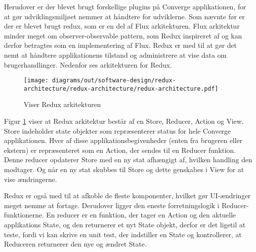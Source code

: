 Herudover er der blevet brugt forskellige plugins på Converge applikationen, for at gør udviklingsmiljøet nemmer at håndtere for udviklerne. Som nævnte før er der er blevet brugt redux, som er en del af Flux arkitekturen. Flux arkitektur minder meget om observer-observable pattern, som Redux inspireret af og kan derfor betragtes som en implementering af Flux. Redux er med til at gør det nemt at håndtere applikationens tilstand og administrere at vise data om brugerhandlinger. Nedenfor ses arkitekturen for Redux.

\begin{figure}[H]
    \centering
\texttt{[image: diagrams/out/software-design/redux-architecture/redux-architecture/redux-architecture.pdf]}
\caption{Viser Redux arkitekturen}
\label{fig:redux}
\end{figure}

Figur \ref{fig:redux} viser at Redux arkitektur består af en Store, Reducer, Action og View. Store indeholder state objekter som repræsenterer status for hele Converge applikationen. Hver af disse applikationsbegivenheder (enten fra brugeren eller ekstern) er repræsenteret som en Action, der sendes til en Reducer funktion. Denne reducer opdaterer Store med en ny stat afhængigt af, hvilken handling den modtager. Og når en ny stat skubbes til Store og dette genskabes i View for at vise ændringerne. 

Redux er også med til at afkoble de fleste komponenter, hvilket gør UI-ændringer meget nemme at fortage. Derudover ligger den eneste forretningslogik i Reducer-funktionerne. En reducer er en funktion, der tager en Action og den aktuelle applikations State, og den returnerer et nyt State objekt, derfor er det ligetil at teste, fordi vi kan skrive en unit test, der indstiller en State og kontrollerer, at Reduceren returnerer den nye og ændret State.
